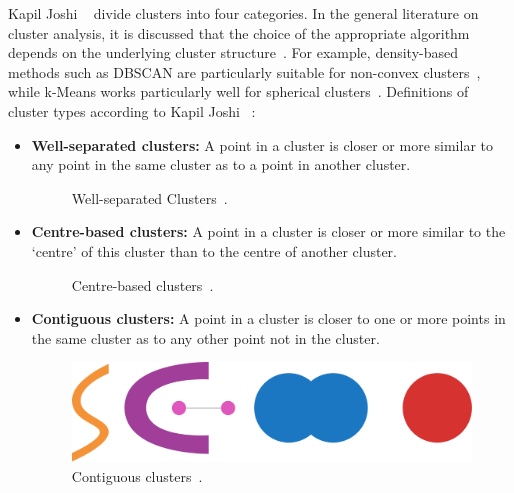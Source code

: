 \documentclass[10pt,twocolumn,letterpaper]{article}
\begin{document}
Kapil Joshi \etal~\cite{Joshi2015} divide clusters into four categories. In the
general literature on cluster analysis, it is discussed that the choice of the
appropriate algorithm depends on the underlying cluster
structure~\cite{Ezugwu2022104743}. For example, density-based methods such as
DBSCAN are particularly suitable for non-convex clusters~\cite{Bhargav2016},
while k-Means works particularly well for spherical
clusters~\cite{Jain2010651}. Definitions of cluster types according to Kapil
Joshi \etal~\cite{Joshi2015}:
\begin{itemize}
    \item\textbf{Well-separated clusters:} A point in a cluster is closer or more similar to any point in the same cluster
          as to a point in another cluster.
          \begin{figure}[h]
              \centering
              \caption{Well-separated Clusters~\cite{Joshi2015}.}
              \label{fig:well-separated-circles}
          \end{figure}

    \item\textbf{Centre-based clusters:} A point in a cluster is closer or more similar to the ‘centre’ of this cluster
          than to the centre of another cluster.
          \begin{figure}[h]
              \centering
              \caption{Centre-based clusters~\cite{Joshi2015}.}
              \label{fig:well-separated}
          \end{figure}

    \item\textbf{Contiguous clusters:} A point in a cluster is closer to one or more points in the same cluster as to
          any other point not in the cluster.
          \begin{figure}[h]
              \centering
              \includegraphics[width=0.5\linewidth]{figures/Contigous clusters}
              \caption{Contiguous clusters~\cite{Joshi2015}.}
              \label{fig:Contiguous-clusters}
          \end{figure}


\end{itemize}
\end{document}
